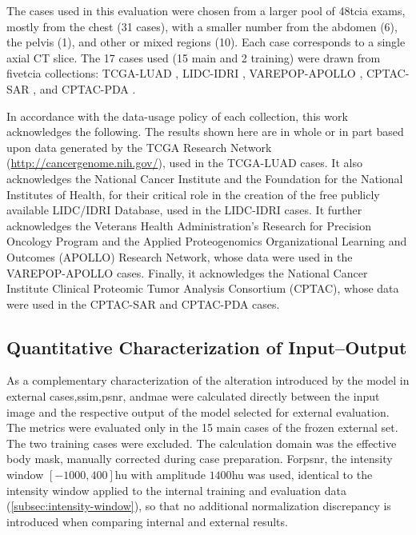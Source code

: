 The cases used in this evaluation were chosen from a larger pool of 48\acrshort{tcia} exams, mostly from the chest (31 cases), with a smaller number from the abdomen (6), the pelvis (1), and other or mixed regions (10). Each case corresponds to a single axial CT slice. The 17 cases used (15 main and 2 training) were drawn from five\acrshort{tcia} collections: TCGA-LUAD \cite{albertinaCancerGenomeAtlas2016}, LIDC-IDRI \cite{armatoDataLIDCIDRI2015}, VAREPOP-APOLLO \cite{repopVAResearchPrecision2024}, CPTAC-SAR \cite{cptacClinicalProteomicTumorSarcomas2019}, and CPTAC-PDA \cite{cptacClinicalProteomicTumorPancreatic2018}. 

In accordance with the data-usage policy of each collection, this work acknowledges the following. The results shown here are in whole or in part based upon data generated by the TCGA Research Network (\url{http://cancergenome.nih.gov/}), used in the TCGA-LUAD cases. It also acknowledges the National Cancer Institute and the Foundation for the National Institutes of Health, for their critical role in the creation of the free publicly available LIDC/IDRI Database, used in the LIDC-IDRI cases. It further acknowledges the Veterans Health Administration's Research for Precision Oncology Program and the Applied Proteogenomics Organizational Learning and Outcomes (APOLLO) Research Network, whose data were used in the VAREPOP-APOLLO cases. Finally, it acknowledges the National Cancer Institute Clinical Proteomic Tumor Analysis Consortium (CPTAC), whose data were used in the CPTAC-SAR and CPTAC-PDA cases.

\subsection{Quantitative Characterization of Input--Output}

As a complementary characterization of the alteration introduced by the model in external cases,\acrshort{ssim},\acrshort{psnr}, and\acrshort{mae} were calculated directly between the input image and the respective output of the model selected for external evaluation. The metrics were evaluated only in the 15 main cases of the frozen external set. The two training cases were excluded. The calculation domain was the effective body mask, manually corrected during case preparation. For\acrshort{psnr}, the intensity window $[-1000,400]$\acrshort{hu} with amplitude $1400$\acrshort{hu} was used, identical to the intensity window applied to the internal training and evaluation data (\autoref{subsec:intensity-window}), so that no additional normalization discrepancy is introduced when comparing internal and external results.

